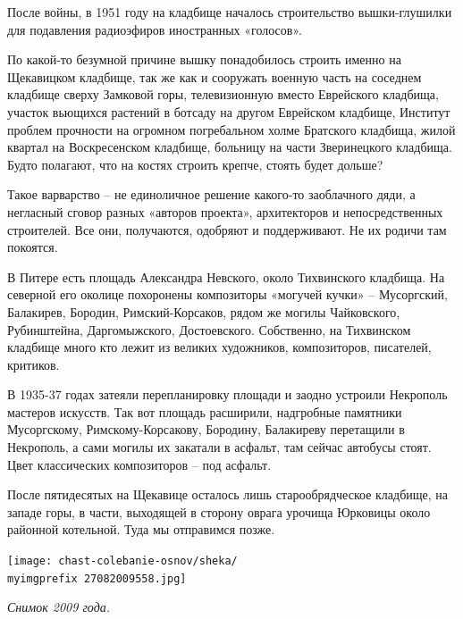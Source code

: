 После войны, в 1951 году на кладбище началось строительство вышки-глушилки для подавления радиоэфиров иностранных «голосов». 


По какой-то безумной причине вышку понадобилось строить именно на Щекавицком кладбище, так же как и сооружать военную часть на соседнем кладбище сверху Замковой горы, телевизионную вместо Еврейского кладбища, участок вьющихся растений в ботсаду на другом Еврейском кладбище, Институт проблем прочности на огромном погребальном холме Братского кладбища, жилой квартал на Воскресенском кладбище, больницу на части Зверинецкого кладбища. Будто полагают, что на костях строить крепче, стоять будет дольше?

Такое варварство – не единоличное решение какого-то заоблачного дяди, а негласный сговор разных «авторов проекта», архитекторов и непосредственных строителей. Все они, получаются, одобряют и поддерживают. Не их родичи там покоятся.

В Питере есть площадь Александра Невского, около Тихвинского кладбища. На северной его околице похоронены композиторы «могучей кучки» – Мусоргский, Балакирев, Бородин, Римский-Корсаков, рядом же могилы Чайковского, Рубинштейна, Даргомыжского, Достоевского. Собственно, на Тихвинском кладбище много кто лежит из великих художников, композиторов, писателей, критиков.

В 1935-37 годах затеяли перепланировку площади и заодно устроили Некрополь мастеров искусств. Так вот площадь расширили, надгробные памятники Мусоргскому, Римскому-Корсакову, Бородину, Балакиреву перетащили в Некрополь, а сами могилы их закатали в асфальт, там сейчас автобусы стоят. Цвет классических композиторов – под асфальт.

После пятидесятых на Щекавице осталось лишь старообрядческое кладбище, на западе горы, в части, выходящей в сторону оврага урочища Юрковицы около районной котельной. Туда мы отправимся позже.

\begin{center}
\texttt{[image: chast-colebanie-osnov/sheka/\\myimgprefix 27082009558.jpg]}

\textit{Снимок 2009 года.}
\end{center}



